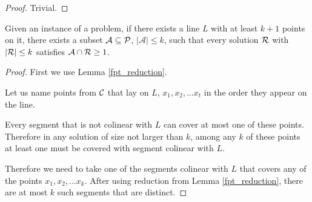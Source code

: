 \begin{proof} Trivial. \end{proof}

\begin{lemma}
	\label{fpt_long_lines}
	Given an instance of a problem, if there exists a line $L$ with at least
	$k+1$ points on it, there exists a subset $\mathcal{A} \subseteq \mathcal{P}$,
	$|\mathcal{A}| \le k$,
	such that every solution $\mathcal{R}$ with $|\mathcal{R}| \le k$
	satisfies $\mathcal{A} \cap \mathcal{R} \ge 1$.
\end{lemma}

\begin{proof}

First we use Lemma \ref{fpt_reduction}.

Let us name points from $\mathcal{C}$ that lay on $L$, $x_1, x_2, \ldots x_t$
in the order they appear on the line.

Every segment that is not colinear with $L$ can cover at most one of these
points. Therefore in any solution of size not larger than $k$,
among any $k$ of these points at least one must
be covered with segment colinear with $L$.

Therefore we need to take one of the segments colinear
with $L$ that covers any of the points
$x_1, x_2, \ldots x_k$. After using reduction from Lemma \ref{fpt_reduction},
there are at most $k$ such segments that are distinct.

\end{proof}



